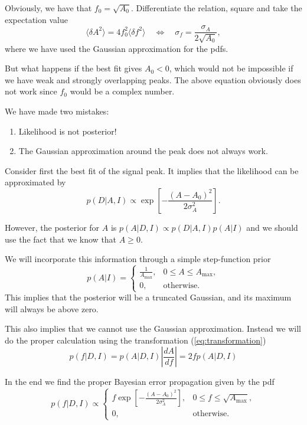 \documentclass[%
oneside,                 %
final,                   %
10pt]{article}
\begin{document}
\noindent
Obviously, we have that $f_0 = \sqrt{A_0}$. Differentiate the relation, square and take the expectation value
\[
\langle \delta A^2 \rangle = 4 f_0^2 \langle \delta f^2 \rangle \quad 
\Leftrightarrow \quad 
\sigma_f = \frac{\sigma_A}{2 \sqrt{A_0}},
\]
where we have used the Gaussian approximation for the pdfs.

But what happens if the best fit gives $A_0 < 0$, which would not be impossible if we have weak and strongly overlapping peaks. The above equation obviously does not work since $f_0$ would be a complex number.

We have made two mistakes:
\begin{enumerate}
\item Likelihood is not posterior!

\item The Gaussian approximation around the peak does not always work.
\end{enumerate}

\noindent
Consider first the best fit of the signal peak. It implies that the likelihood can be approximated by
\[
p(D | A, I) \propto \exp \left[ -\frac{(A-A_0)^2}{2\sigma_A^2} \right].
\]

However, the posterior for $A$ is $p(A|D,I) \propto p(D|A,I) p(A|I)$ and we should use the fact that we know that $A \ge 0$.

We will incorporate this information through a simple step-function prior
\[
p(A|I) = \left\{
\begin{array}{ll}
\frac{1}{A_\mathrm{max}}, & 0 \le A \le A_\mathrm{max}, \\
0, & \mathrm{otherwise}.
\end{array}
\right.
\]
This implies that the posterior will be a truncated Gaussian, and its maximum will always be above zero.

This also implies that we cannot use the Gaussian approximation. Instead we will do the proper calculation using the transformation (\ref{eq:transformation})
\[
p(f|D,I) = p(A|D,I) \left| \frac{dA}{df} \right| = 2 f p(A|D,I)
\]

In the end we find the proper Bayesian error propagation given by the pdf
\[
p(f|D,I) \propto \left\{
\begin{array}{ll}
f \exp \left[ -\frac{(A-A_0)^2}{2\sigma_A^2} \right], & 0 \le f \le \sqrt{A_\mathrm{max}}, \\
0, & \mathrm{otherwise}.
\end{array}
\right.
\]
\end{document}
